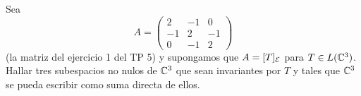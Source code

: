 \item Sea \[A=\begin{pmatrix}
        2&-1&0\\-1&2&-1\\0&-1&2
    \end{pmatrix}\]
    (la matriz del ejercicio 1 del TP 5) y supongamos que $A=[T]_{\mathcal{E}}$ para $T\in L(\mathbb{C}^3)$. Hallar tres subespacios no nulos de $\mathbb{C}^3$ que sean invariantes por $T$ y tales que $\mathbb{C}^3$ se pueda escribir como suma directa de ellos.
    \begin{mdframed}[style=s]
        
    \end{mdframed}